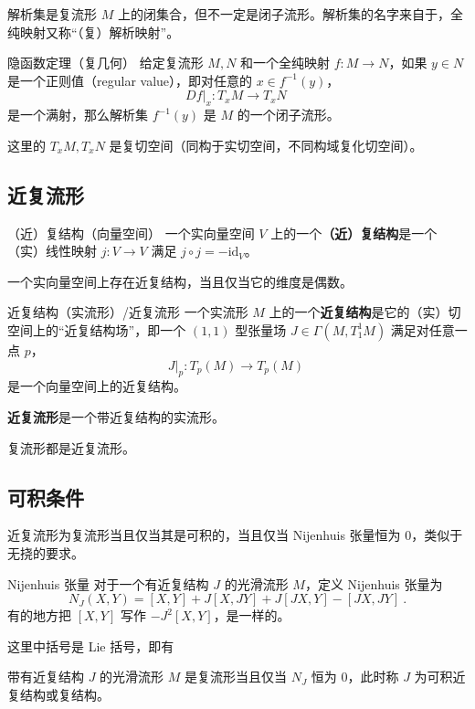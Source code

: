 解析集是复流形 $M$ 上的闭集合，但不一定是闭子流形。解析集的名字来自于，全纯映射又称“（复）解析映射”。

\begin{theorem}{隐函数定理（复几何）}
给定复流形 $M, N$ 和一个全纯映射 $f: M \to N$，如果 $y \in N$ 是一个正则值（regular value），即对任意的 $x \in f^{-1}(y)$，
$$
D f|_x: T_x M \to T_x N~
$$
是一个满射，那么解析集 $f^{-1}(y)$ 是 $M$ 的一个闭子流形。
\end{theorem}
这里的 $T_x M, T_x N$ 是复切空间（同构于实切空间，不同构域复化切空间）。


\subsection{近复流形}

\begin{definition}{（近）复结构（向量空间）}
一个实向量空间 $V$ 上的一个\textbf{（近）复结构}是一个（实）线性映射 $j: V \to V$ 满足 $j \circ j = - \text{id}_V$。
\end{definition}

\begin{theorem}{}
一个实向量空间上存在近复结构，当且仅当它的维度是偶数。
\end{theorem}

\begin{definition}{近复结构（实流形）/近复流形}
一个实流形 $M$ 上的一个\textbf{近复结构}是它的（实）切空间上的“近复结构场”，即一个 $(1, 1)$ 型张量场 $J \in \Gamma(M, T_1^1 M)$ 满足对任意一点 $p$， 
$$
J|_p: T_p(M) \to T_p(M)~
$$
是一个向量空间上的近复结构。

\textbf{近复流形}是一个带近复结构的实流形。
\end{definition}

\begin{theorem}{}
复流形都是近复流形。
\end{theorem}

\subsection{可积条件}
近复流形为复流形当且仅当其是可积的，当且仅当 Nijenhuis 张量恒为 $0$，类似于无挠的要求。
\begin{definition}{Nijenhuis 张量}
对于一个有近复结构 $J$ 的光滑流形 $M$，定义 Nijenhuis 张量为
\begin{equation}
N_J(X, Y) = [X, Y] + J[X, JY] + J[JX, Y] - [JX, JY] ~.
\end{equation}
有的地方把 $[X, Y]$ 写作 $-J^2[X, Y]$，是一样的。
\end{definition}

这里中括号是 Lie 括号，即有 
\begin{equation}
[X, Y] 
\end{equation}


\begin{theorem}{}
带有近复结构 $J$ 的光滑流形 $M$ 是复流形当且仅当 $N_J$ 恒为 $0$，此时称 $J$ 为可积近复结构或复结构。
\end{theorem}







